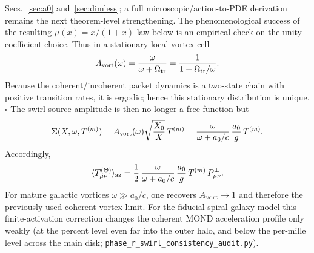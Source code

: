 \documentclass[11pt]{article}
\begin{document}
Secs.~\ref{sec:a0} and~\ref{sec:dimless}; a full microscopic/action-to-PDE
derivation remains the next theorem-level strengthening.  The phenomenological
success of the resulting $\mu(x)=x/(1+x)$ law below is an empirical check on
the unity-coefficient choice.
Thus in a stationary local vortex cell
\[
A_{\rm vort}(\omega)
= \frac{\omega}{\omega+\Omega_{\rm tr}}
= \frac{1}{1+\Omega_{\rm tr}/\omega}.
\]
Because the coherent/incoherent packet dynamics is a two-state chain with
positive transition rates, it is ergodic; hence this stationary
distribution is unique. \hfill$\square$
The swirl-source amplitude is then no longer a free function but
\[
\Sigma(X,\omega,T^{(m)})
= A_{\rm vort}(\omega)\sqrt{\frac{X_0}{X}}\,T^{(m)}
= \frac{\omega}{\omega+a_0/c}\,\frac{a_0}{g}\,T^{(m)}.
\]
Accordingly,
\[
\langle T^{(\Theta)}_{\mu\nu}\rangle_{\rm az}
= \frac12\,
\frac{\omega}{\omega+a_0/c}\,
\frac{a_0}{g}\,
T^{(m)}\,P^\perp_{\mu\nu}.
\]
For mature galactic vortices $\omega\gg a_0/c$, one recovers
$A_{\rm vort}\to1$ and therefore the previously used coherent-vortex limit.
For the fiducial spiral-galaxy model this finite-activation correction changes
the coherent MOND acceleration profile only weakly (at the percent level even
far into the outer halo, and below the per-mille level across the main disk;
\nolinkurl{phase_r_swirl_consistency_audit.py}).
\end{document}
